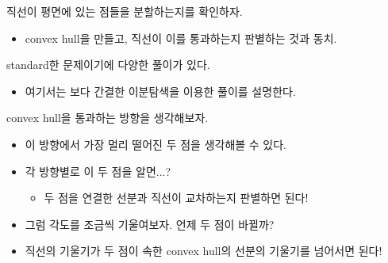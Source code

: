 \documentclass[hyperref={unicode}]{beamer}
\begin{document}
 
    \begin{frame}
         직선이 평면에 있는 점들을 분할하는지를 확인하자.
        \begin{itemize}
            \item<2-> convex hull을 만들고, 직선이 이를 통과하는지 판별하는 것과 동치.
        \end{itemize}
         standard한 문제이기에 다양한 풀이가 있다.
        \begin{itemize}
            \item<4-> 여기서는 보다 간결한 이분탐색을 이용한 풀이를 설명한다.
        \end{itemize}
        
    \end{frame}
    
    \begin{frame}
         convex hull을 통과하는 방향을 생각해보자.
        \begin{itemize}
            \item<2-> 이 방향에서 가장 멀리 떨어진 두 점을 생각해볼 수 있다.
            \item<3-> 각 방향별로 이 두 점을 알면...?
            \begin{itemize}
                \item<4-> 두 점을 연결한 선분과 직선이 교차하는지 판별하면 된다!
            \end{itemize}
            \item<5-> 그럼 각도를 조금씩 기울여보자. 언제 두 점이 바뀔까?
            \item<6-> 직선의 기울기가 두 점이 속한 convex hull의 선분의 기울기를 넘어서면 된다!
        \end{itemize}
    \end{frame}
    
\end{document}
